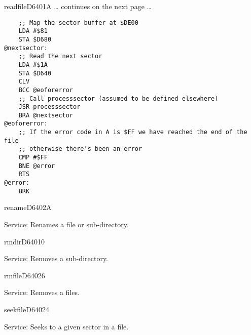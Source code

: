 \begin{hyppotrap}{readfile}{D640}{1A}
\ldots{} continues on the next page \ldots

\begin{tcolorbox}[colback=black,coltext=white]
\verbatimfont{\codefont}
\begin{verbatim}
    ;; Map the sector buffer at $DE00
    LDA #$81
    STA $D680
@nextsector:
    ;; Read the next sector
    LDA #$1A
    STA $D640
    CLV
    BCC @eoforerror
    ;; Call processsector (assumed to be defined elsewhere)
    JSR processsector
    BRA @nextsector
@eoforerror:
    ;; If the error code in A is $FF we have reached the end of the file
    ;; otherwise there's been an error
    CMP #$FF
    BNE @error
    RTS
@error:
    BRK
\end{verbatim}
\end{tcolorbox}
\end{hyppotrap}


\newpage
\begin{hyppotrap}{rename}{D640}{2A}
\item [Service:]
  Renames a file or sub-directory.
\notimplemented
\end{hyppotrap}


\begin{hyppotrap}{rmdir}{D640}{10}
\item [Service:]
  Removes a sub-directory.
\notimplemented
\end{hyppotrap}


\begin{hyppotrap}{rmfile}{D640}{26}
\item [Service:]
  Removes a files.
\notimplemented
\end{hyppotrap}


\begin{hyppotrap}{seekfile}{D640}{24}
\item [Service:]
  Seeks to a given sector in a file.
\notimplemented
\end{hyppotrap}


